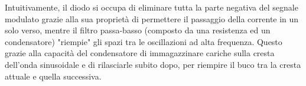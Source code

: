 \documentclass[11pt,a4paper]{article}
\begin{document}
Intuitivamente, il diodo si occupa di eliminare tutta la parte negativa del segnale modulato grazie alla sua proprietà di permettere il passaggio della corrente in un solo verso, mentre il filtro passa-basso (composto da una resistenza ed un condensatore) "riempie" gli spazi tra le oscillazioni ad alta frequenza. Questo grazie alla capacità del condensatore di immagazzinare cariche sulla cresta dell'onda sinusoidale e di rilasciarle subito dopo, per riempire il buco tra la cresta attuale e quella successiva.
\end{document}
